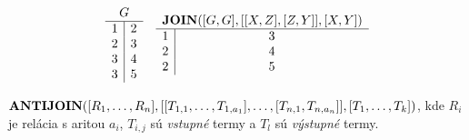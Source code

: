     \begin{priklad}
    \begin{center}
        \[
        \begin{array}{c c}
            \begin{array}{c|c}
                \multicolumn{2}{c}{G} \\ \hline
                1 & 2 \\
                2 & 3 \\
                3 & 4 \\
                3 & 5 \\
            \end{array}
            &
            \begin{array}{c|c}
                \multicolumn{2}{c}{\JOIN([G, G], [[X, Z], [Z, Y]], [X, Y])} \\ \hline
                1 & 3 \\
                2 & 4 \\
                2 & 5 \\
            \end{array}
        \end{array}
        \]
    \end{center}
    \end{priklad}

        
\vline

$\textbf{ANTIJOIN}([R_1, \dots, R_n], [[T_{1, 1}, \dots, T_{1, a_1}], \dots, [T_{n, 1}, T_{n, a_n}]], [T_1,
\dots, T_k])$, kde $R_i$ je relácia s aritou $a_i$, $T_{i, j}$ sú \textit{vstupné} termy a $T_l$ sú
\textit{výstupné} termy.
    
